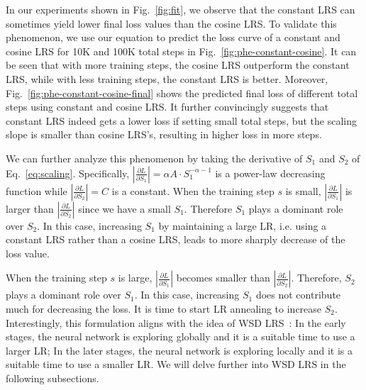 In our experiments shown in Fig.~\ref{fig:fit}, we observe that the constant LRS can sometimes yield lower final loss values than the cosine LRS.
To validate this phenomenon, we use our equation to predict the loss curve of a constant and cosine LRS for 10K and 100K total steps in Fig.~\ref{fig:phe-constant-cosine}. It can be seen that with more training steps, the cosine LRS outperform the constant LRS, while with less training steps, the constant LRS is better.
Moreover, Fig.~\ref{fig:phe-constant-cosine-final} shows the predicted final loss of different total steps using constant and cosine LRS. It further convincingly suggests that constant LRS indeed gets a lower loss if setting small total steps, but the scaling slope is smaller than cosine LRS's, resulting in higher loss in more steps.

We can further analyze this phenomenon by taking the derivative of $S_1$ and $S_2$ of Eq.~\ref{eq:scaling}. Specifically, $|\frac{\partial L}{\partial S_1}| = \alpha A \cdot S_1^{-\alpha-1}$ is a power-law decreasing function while $|\frac{\partial L}{\partial S_2}| = C$ is a constant.
When the training step $s$ is small, $|\frac{\partial L}{\partial S_1}|$ is larger than $|\frac{\partial L}{\partial S_2}|$ since we have a small $S_1$. Therefore $S_1$ plays a dominant role over $S_2$. In this case, increasing $S_1$ by maintaining a large LR, i.e. using a constant LRS rather than a cosine LRS, leads to more sharply decrease of the loss value.

When the training step $s$ is large,
$|\frac{\partial L}{\partial S_1}|$ becomes smaller than $|\frac{\partial L}{\partial S_2}|$. Therefore, $S_2$ plays a dominant role over $S_1$. In this case, increasing $S_1$ does not contribute much for decreasing the loss. It is time to start LR annealing to increase $S_2$. 
Interestingly, this formulation aligns with the idea of WSD LRS~\citep{hu2024minicpm}: 
In the early stages, the neural network is exploring globally and it is a suitable time to use a larger LR; In the later stages, the neural network is exploring locally and it is a suitable time to use a smaller LR.
We will delve further into WSD LRS in the following subsections.

